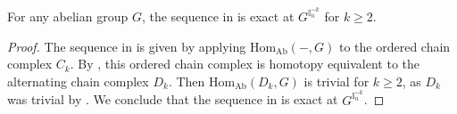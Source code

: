  \begin{lemma}\label{LemmaExactnessIntervalApproxLaterTerms}
   For any abelian group $G$, the sequence in  is exact at $G^{\mathbb I_n^{\sim k}}$
  for $k\geq 2$. 
\end{lemma} 

\begin{proof}
  The sequence in  is given by applying $\mathrm{Hom}_{\mathrm{Ab}}(-,G)$ to the ordered chain complex $C_k$.
  By \parencite[Theorem VI.6.10]{EilenbergSteenrod}, this ordered chain complex is homotopy equivalent to the alternating chain complex $D_k$. Then $\mathrm{Hom}_{\mathrm{Ab}}(D_k,G)$ is trivial for $k\geq 2$, as $D_k$ was trivial by .
  We conclude that the sequence in  is exact at $G^{\mathbb I_n^{\sim k}}$.
\end{proof}


